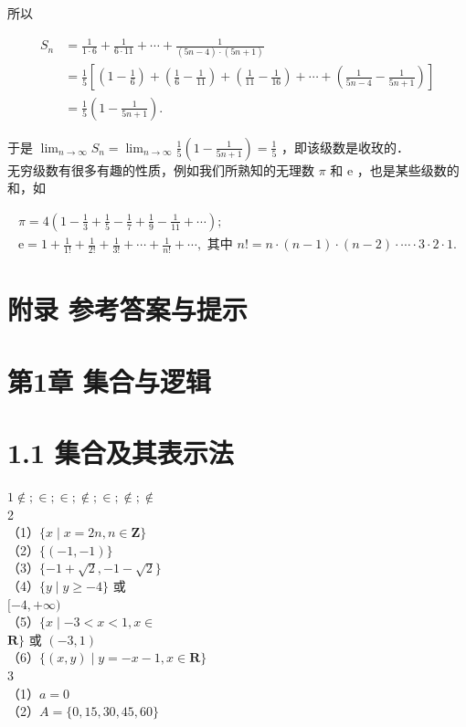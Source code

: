 \documentclass[10pt]{article}
\begin{document}
所以

\[
\begin{aligned}
S_{n} & =\frac{1}{1 \cdot 6}+\frac{1}{6 \cdot 11}+\cdots+\frac{1}{(5 n-4) \cdot(5 n+1)} \\
& =\frac{1}{5}\left[\left(1-\frac{1}{6}\right)+\left(\frac{1}{6}-\frac{1}{11}\right)+\left(\frac{1}{11}-\frac{1}{16}\right)+\cdots+\left(\frac{1}{5 n-4}-\frac{1}{5 n+1}\right)\right] \\
& =\frac{1}{5}\left(1-\frac{1}{5 n+1}\right) .
\end{aligned}
\]

于是 \(\lim _{n \rightarrow \infty} S_{n}=\lim _{n \rightarrow \infty} \frac{1}{5}\left(1-\frac{1}{5 n+1}\right)=\frac{1}{5}\) ，即该级数是收玫的．\\
无穷级数有很多有趣的性质，例如我们所熟知的无理数 \(\pi\) 和 e ，也是某些级数的和，如

\[
\begin{gathered}
\pi=4\left(1-\frac{1}{3}+\frac{1}{5}-\frac{1}{7}+\frac{1}{9}-\frac{1}{11}+\cdots\right) ; \\
\mathrm{e}=1+\frac{1}{1!}+\frac{1}{2!}+\frac{1}{3!}+\cdots+\frac{1}{n!}+\cdots, \text { 其中 } n!=n \cdot(n-1) \cdot(n-2) \cdot \cdots \cdot 3 \cdot 2 \cdot 1 .
\end{gathered}
\]

\section*{附录 参考答案与提示}
\section*{第1章 集合与逻辑}
\section*{1.1 集合及其表示法}
\(1 \notin ; \in ; \in ; \notin ; \in ; \notin ; \notin\)\\
2\\
（1）\(\{x \mid x=2 n, n \in \mathbf{Z}\}\)\\
（2）\(\{(-1,-1)\}\)\\
（3）\(\{-1+\sqrt{2},-1-\sqrt{2}\}\)\\
（4）\(\{y \mid y \geqslant-4\}\) 或\\
\([-4,+\infty)\)\\
（5）\(\{x \mid-3<x<1, x \in\)\\
\(\mathbf{R}\}\) 或 \((-3,1)\)\\
（6）\(\{(x, y) \mid y=-x-1, x \in \mathbf{R}\}\)\\
3\\
（1）\(a=0\)\\
（2）\(A=\{0,15,30,45,60\}\)
\end{document}

